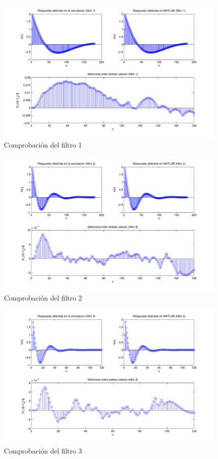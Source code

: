 \documentclass[a4paper,12pt]{report}
\begin{document}
\begin{figure}[hbt]
\includegraphics[width=\textwidth]{img/respfiltro1.pdf} 
\caption{Comprobación del filtro 1} \label{fig:filter1}
\end{figure}

\begin{figure}[hbt]
\includegraphics[width=\textwidth]{img/respfiltro2.pdf} 
\caption{Comprobación del filtro 2} \label{fig:filter2}
\end{figure}

\begin{figure}[hbt]
\includegraphics[width=\textwidth]{img/respfiltro3.pdf} 
\caption{Comprobación del filtro 3} \label{fig:filter3}
\end{figure}
\end{document}
